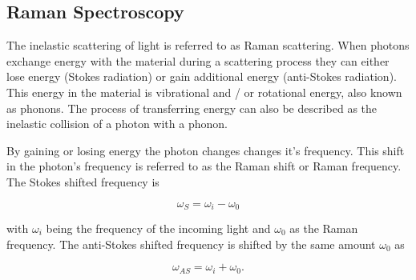 \subsection{Raman Spectroscopy}

The inelastic scattering of light is referred to as Raman scattering. When photons exchange
energy with the material during a scattering process they can either lose energy (Stokes radiation)
or gain additional energy (anti-Stokes radiation). This energy in the material is vibrational and / or
rotational energy, also known as phonons. The process of transferring energy can also be described as
the inelastic collision of a photon with a phonon.

By gaining or losing energy the photon changes changes it's frequency. This shift in the photon's
frequency is referred to as the Raman shift or Raman frequency. The Stokes shifted frequency is

\begin{equation}
  \omega_S=\omega_i-\omega_0
\end{equation}


with $\omega_i$ being the frequency of the incoming light and $\omega_0$ as the Raman frequency.
The anti-Stokes shifted frequency is shifted by the same amount $\omega_0$ as

\begin{equation}
  \omega_{AS}=\omega_i+\omega_0.
\end{equation}
